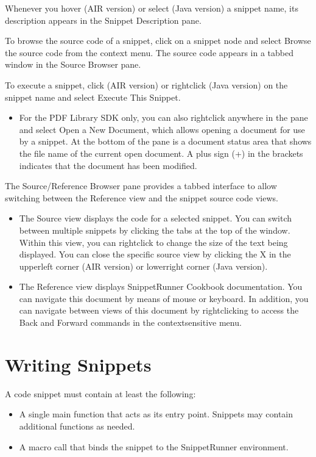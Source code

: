 \documentclass[letterpaper,12pt,english,openany,oneside]{sphinxmanual}
\begin{document}
Whenever you hover (AIR version) or select (Java version) a snippet name, its description appears in the Snippet Description pane.

To browse the source code of a snippet, click on a snippet node and select Browse the source code from the context menu. The source code appears in a tabbed window in the Source Browser pane.

To execute a snippet, click (AIR version) or right\sphinxhyphen{}click (Java version) on the snippet name and select Execute This Snippet.
\begin{itemize}
\item {} 
For the PDF Library SDK only, you can also right\sphinxhyphen{}click anywhere in the pane and select Open a New Document, which allows opening a document for use by a snippet. At the bottom of the pane is a document status area that shows the file name of the current open document. A plus sign (+) in the brackets indicates that the document has been modified.

\end{itemize}

The Source/Reference Browser pane provides a tabbed interface to allow switching between the Reference view and the snippet source code views.
\begin{itemize}
\item {} 
The Source view displays the code for a selected snippet. You can switch between multiple snippets by clicking the tabs at the top of the window. Within this view, you can right\sphinxhyphen{}click to change the size of the text being displayed. You can close the specific source view by clicking the X in the upper\sphinxhyphen{}left corner (AIR version) or lower\sphinxhyphen{}right corner (Java version).

\item {} 
The Reference view displays SnippetRunner Cookbook documentation. You can navigate this document by means of mouse or keyboard. In addition, you can navigate between views of this document by right\sphinxhyphen{}clicking to access the Back and Forward commands in the context\sphinxhyphen{}sensitive menu.

\end{itemize}




\chapter{Writing Snippets}
\label{\detokenize{Snippet_WritingSnippets:writing-snippets}}\label{\detokenize{Snippet_WritingSnippets::doc}}
A code snippet must contain at least the following:
\begin{itemize}
\item {} 
A single main function that acts as its entry point. Snippets may contain additional functions as needed.

\item {} 
A macro call that binds the snippet to the SnippetRunner environment.

\end{itemize}
\end{document}
